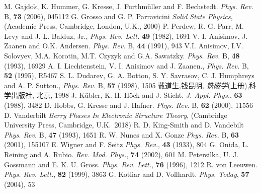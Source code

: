 {\begin{thebibliography}{99}
{\textrm{M. Gajdo$\check{s}$, K. Hummer, G. Kresse, J. Furthm\"uller and F. Bechstedt. \textit{Phys. Rev.} B, \textbf{73} (2006), 045112}
\textrm{G. Grosso and G. P. Parravicini \textit{Solid State Physics},  (Academic Press, Cambridge, London, U.K., 2000)}
	\textrm{P. Perdew, R. G. Parr, M. Levy and J. L. Balduz, Jr., \textit{Phys. Rev. Lett.} \textbf{49} (1982), 1691}
	\textrm{V. I. Anisimov, J. Zaanen and O.K. Andersen. \textit{Phys. Rev.} B, \textbf{44} (1991), 943}
	\textrm{V.I. Anisimov, I.V. Solovyev, M.A. Korotin, M.T. Czyzyk and G.A. Sawatzky. \textit{Phys. Rev.} B, \textbf{48} (1993), 16929}
	\textrm{A. I. Liechtenstein, V. I. Anisimov and J. Zaanen., \textit{Phys. Rev.} B, \textbf{52} (1995), R5467}
	\textrm{S. L. Dudarev, G. A. Botton, S. Y. Savrasov, C. J. Humphreys and A. P. Sutton., \textit{Phys. Rev.} B, \textbf{57} (1998), 1505}
戴道生,钱昆明, {\textit{铁磁学}}(上册),\:科学出版社, 北京, 1998
\textrm{J. K\"ubler, K. H. H\"ock and J. Sticht. \textit{J. Appl. Phys.}, \textbf{63} (1988), 3482}
\textrm{D. Hobbs, G. Kresse and J. Hafner. \textit{Phys. Rev.} B, \textbf{62} (2000), 11556}
	\textrm{D. Vanderbilt \textit{Berry Phases In Electronic Structure Theory}, (Cambridge University Press, Cambridge, U.K.~2018)}
	\textrm{R. D. King-Smith and D. Vandebilt \textit{Phys. Rev.} B, \textbf{47} (1993), 1651}
	\textrm{R. W. Nunes and X. Gonze \textit{Phys. Rev.} B, \textbf{63} (2001), 155107}
	\textrm{E. Wigner and F. Seitz \textit{Phys. Rev.}, \textbf{43} (1933), 804}
\textrm{G. Onida, L. Reining and A. Rubio. \textit{Rev. Mod. Phys.}, \textbf{74} (2002), 601}
\textrm{M. Petersilka, U. J. Gossmann and E. K. U. Gross. \textit{Phys. Rev. Lett.}, \textbf{76} (1996), 1212}
\textrm{R. von Leeuwen. \textit{Phys. Rev. Lett.}, \textbf{82} (1999), 3863}
\textrm{G. Kotliar and D. Vollhardt. \textit{Phys. Today}, \textbf{57} (2004), 53}
}
\end{thebibliography}
}

\appendix

